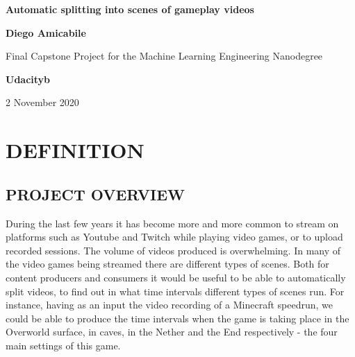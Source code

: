 \documentclass[
]{article}
\author{}
\date{}
\newcommand{\hhref}[3][blue]{\href{#2}{\color{#1}{#3}}}%
\begin{document}
\begin{titlepage}
	\begin{center}
		\vspace*{1cm}
		
		\textbf{Automatic splitting into scenes of gameplay videos}
		
		\vspace{0.5cm}
		\hhref{https://github.com/diegoami/DA_ML_Capstone}{https://github.com/diegoami/DA\_ML\_Capstone}
		
		\vspace{1.5cm}
		
		\textbf{Diego Amicabile}
		
		\vfill
		
		Final Capstone Project for the Machine Learning Engineering Nanodegree
		\vspace{0.8cm}
	
		\textbf{Udacityb}
		
		\vspace{0.8cm}
		

		2 November 2020
		
	\end{center}
\end{titlepage}

\hypertarget{definition}{%
\section{DEFINITION}\label{definition}}

\hypertarget{project-overview}{%
\subsection{PROJECT OVERVIEW}\label{project-overview}}

During the last few years it has become more and more common to stream
on platforms such as Youtube and Twitch while playing video games, or to
upload recorded sessions. The volume of videos produced is overwhelming.
In many of the video games being streamed there are different types of
scenes. Both for content producers and consumers it would be useful to
be able to automatically split videos, to find out in what time
intervals different types of scenes run. For instance, having as an
input the video recording of a Minecraft speedrun, we could be able to
produce the time intervals when the game is taking place in the
Overworld surface, in caves, in the Nether and the End respectively -
the four main settings of this game.
\end{document}
